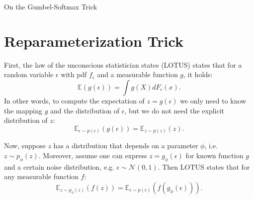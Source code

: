 \documentclass[11pt]{article}
\def\E{\mathbb{E}}
\def\eps{\epsilon}
\begin{document}
\begin{center}
{\LARGE On the Gumbel-Softmax Trick} 
\end{center}

\begin{abstract}
The reparameterization trick enables optimizing networks with stochastic units via gradient descent \cite{KingmaW13}. The essence of the trick is to refactor each stochastic unit into a differentiable function of its parameters and a random variable with fixed distribution. After refactoring, the gradients of the loss propagated by the chain rule are low variance unbiased estimators of the gradients of the expected loss. While many continuous random variables have such reparameterizations, discrete random variables lack useful reparameterizations due to the discontinuous nature of discrete states. As a remedy, the gumbel soft-max trick \cite{jang2016categorical} giving rise to the concrete distribution \cite{MaddisonMT16} serves as a continuous relaxation of discrete random variables. See \cite{KingmaW13}, \cite{MaddisonMT16}, \cite{jang2016categorical}, \cite{casmls2017}, \cite{jang2016}.
\end{abstract}

\section{Reparameterization Trick}

First, the law of the unconscious statistician states (LOTUS) states that for a random variable $\eps$ with pdf $f_\eps$ and a measurable function $g$, it holds:
\begin{equation}
\E(g(\eps)) = \int g(X) d F_\eps(x).
\end{equation}
In other words, to compute the expectation of $z = g(\eps)$ we only need to know the mapping $g$ and the distribution of $\epsilon$, but we do not need the explicit distribution of $z$:
\begin{equation}
\E_{\eps\sim p(\eps)}(g(\eps)) = \E_{z\sim p(z)}(z).
\end{equation}

Now, suppose $z$ has a distribution that depends on a parameter $\phi$, i.e. $z\sim p_\phi (z)$. Moreover, assume one can express $z = g_\phi(\eps)$ for known function $g$ and a certain noise distribution, e.g. $\eps\sim\mathcal{N}(0,1)$. Then LOTUS states that for any measurable function $f$:
\begin{equation}
\E_{z\sim p_\phi (z)}(f(z)) = \E_{\eps\sim p(\eps)}(f(g_\phi(\eps))).
\end{equation}
\end{document}
